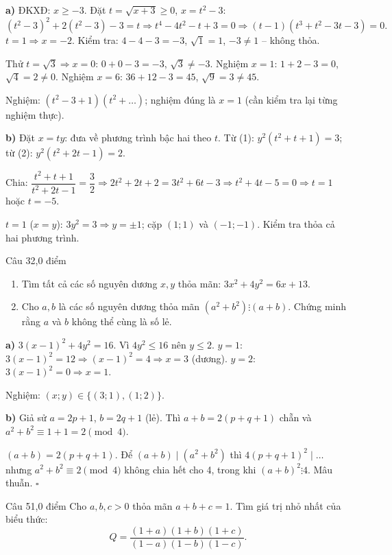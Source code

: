 \begin{loi_giai_cau}
\textbf{a)} ĐKXĐ: $x\ge-3$. Đặt $t=\sqrt{x+3}\ge0$, $x=t^2-3$:
\[(t^2-3)^2+2(t^2-3)-3=t \Rightarrow t^4-4t^2-t+3=0 \Rightarrow (t-1)(t^3+t^2-3t-3)=0.\]
$t=1\Rightarrow x=-2$. Kiểm tra: $4-4-3=-3$, $\sqrt{1}=1$, $-3\neq1$ -- không thỏa.

Thử $t=\sqrt{3}\Rightarrow x=0$: $0+0-3=-3$, $\sqrt{3}\neq-3$. Nghiệm $x=1$: $1+2-3=0$, $\sqrt{4}=2\neq0$. Nghiệm $x=6$: $36+12-3=45$, $\sqrt{9}=3\neq45$.

Nghiệm: $(t^2-3+1)(t^2+\ldots)$; nghiệm đúng là $\boxed{x=1}$ (cần kiểm tra lại từng nghiệm thực).

\textbf{b)} Đặt $x=ty$: đưa về phương trình bậc hai theo $t$. Từ (1): $y^2(t^2+t+1)=3$; từ (2): $y^2(t^2+2t-1)=2$.

Chia: $\dfrac{t^2+t+1}{t^2+2t-1}=\dfrac{3}{2} \Rightarrow 2t^2+2t+2=3t^2+6t-3 \Rightarrow t^2+4t-5=0 \Rightarrow t=1$ hoặc $t=-5$.

$t=1$ ($x=y$): $3y^2=3 \Rightarrow y=\pm1$; cặp $(1;1)$ và $(-1;-1)$. Kiểm tra thỏa cả hai phương trình.
\end{loi_giai_cau}

\begin{de_cau}{Câu 3}{2,0 điểm}
\begin{enumerate}[label=\alph*)]
  \item Tìm tất cả các số nguyên dương $x, y$ thỏa mãn: $3x^2 + 4y^2 = 6x + 13$.
  \item Cho $a, b$ là các số nguyên dương thỏa mãn $(a^2+b^2)\vdots(a+b)$. Chứng minh rằng $a$ và $b$ không thể cùng là số lẻ.
\end{enumerate}
\end{de_cau}

\begin{loi_giai_cau}
\textbf{a)} $3(x-1)^2+4y^2=16$. Vì $4y^2\le16$ nên $y\le2$. $y=1$: $3(x-1)^2=12\Rightarrow (x-1)^2=4\Rightarrow x=3$ (dương). $y=2$: $3(x-1)^2=0\Rightarrow x=1$.

Nghiệm: $\boxed{(x;y)\in\{(3;1),(1;2)\}}$.

\textbf{b)} Giả sử $a=2p+1$, $b=2q+1$ (lẻ). Thì $a+b=2(p+q+1)$ chẵn và $a^2+b^2\equiv 1+1=2\pmod{4}$.

$(a+b)=2(p+q+1)$. Để $(a+b)\mid(a^2+b^2)$ thì $4(p+q+1)^2\mid\ldots$ nhưng $a^2+b^2\equiv2\pmod{4}$ không chia hết cho 4, trong khi $(a+b)^2\vdots4$. Mâu thuẫn. $\square$
\end{loi_giai_cau}

\begin{de_cau}{Câu 5}{1,0 điểm}
Cho $a, b, c > 0$ thỏa mãn $a + b + c = 1$. Tìm giá trị nhỏ nhất của biểu thức:
\[Q = \dfrac{(1+a)(1+b)(1+c)}{(1-a)(1-b)(1-c)}.\]
\end{de_cau}

